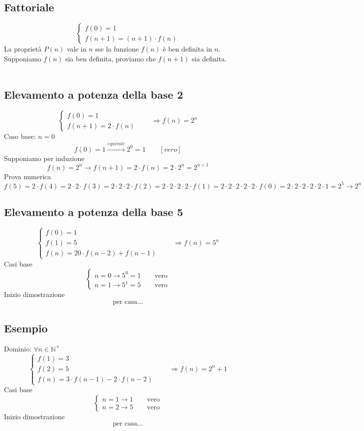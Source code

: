 \documentclass[italian]{article}
\begin{document}
\subsection{Fattoriale}
\[
	\begin{cases*}
		f(0)=1 \\
		f(n+1)=(n+1)\cdot f(n)
	\end{cases*} 
\]
La proprietà $P(n)$ vale in $n$ sse la funzione $f(n)$ è ben definita in $n$.\\
Supponiamo $f(n)$ sia ben definita, proviamo che $f(n+1)$ sia definita.\\\\
\subsection{Elevamento a potenza della base 2}
\[
	\begin{cases*}
		f(0)=1 \\
		f(n+1)=2\cdot f(n)
	\end{cases*} 
	\qquad \Rightarrow f(n) = 2^n
\]
Caso base: $n=0$
\[
	f(0) = 1 \xrightarrow{equivale} 2^0=1 \qquad [vero]
\]
Supponiamo per induzione
\[
	f(n) = 2^n \to f(n+1)=2\cdot f(n) = 2\cdot 2^n = 2^{n+1}
\]
Prova numerica
\[
	f(5) = 2\cdot f(4) = 2\cdot2\cdot f(3) = 2\cdot2\cdot2\cdot f(2) = 2\cdot2\cdot2\cdot2\cdot f(1) = 2\cdot2\cdot2\cdot2\cdot2\cdot f(0) = 2\cdot2\cdot2\cdot2\cdot2\cdot1 = 2^5 \to 2^n
\]

\subsection{Elevamento a potenza della base 5}
\[
	\begin{cases*}
		f(0)=1 \\
		f(1) = 5 \\
		f(n)= 20 \cdot f(n-2) + f(n-1)
	\end{cases*} 
	\qquad \Rightarrow f(n) = 5^n
\]
Casi base
\[
	\begin{cases*}
		n = 0 \to 5^0 = 1 \qquad \text{vero} \\
		n = 1 \to 5^1 = 5 \qquad \text{vero}
	\end{cases*} 	
\]
Inizio dimostrazione
\begin{gather*}
	\text{per casa...}
\end{gather*}


\subsection{Esempio}
Dominio: $\forall n \in \mathbb{N^+}$
\[
	\begin{cases*}
		f(1)=3 \\
		f(2) = 5 \\
		f(n)= 3 \cdot f(n-1) - 2\cdot f(n-2)
	\end{cases*} 
\qquad \Rightarrow f(n) = 2^n + 1
\]
Casi base
\[
\begin{cases*}
	n = 1 \to 1  \qquad \text{vero} \\
	n = 2 \to 5 \qquad \text{vero}
\end{cases*} 	
\]
Inizio dimostrazione
\begin{gather*}
	\text{per casa...}
\end{gather*}
\end{document}
